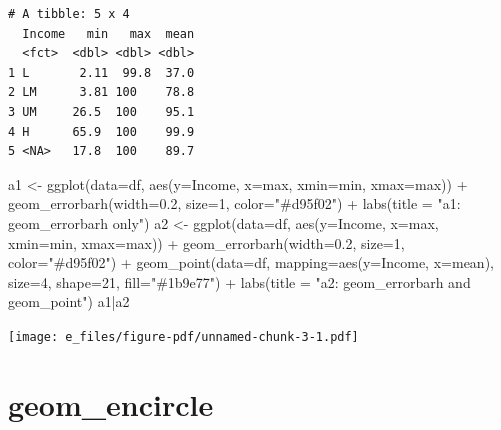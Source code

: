 \documentclass[
  letterpaper,
  DIV=11,
  numbers=noendperiod]{scrreprt}
\newenvironment{Shaded}{\begin{snugshade}}{\end{snugshade}}
\newcommand{\AttributeTok}[1]{\textcolor[rgb]{0.40,0.45,0.13}{#1}}
\newcommand{\DecValTok}[1]{\textcolor[rgb]{0.68,0.00,0.00}{#1}}
\newcommand{\FloatTok}[1]{\textcolor[rgb]{0.68,0.00,0.00}{#1}}
\newcommand{\FunctionTok}[1]{\textcolor[rgb]{0.28,0.35,0.67}{#1}}
\newcommand{\NormalTok}[1]{\textcolor[rgb]{0.00,0.23,0.31}{#1}}
\newcommand{\OtherTok}[1]{\textcolor[rgb]{0.00,0.23,0.31}{#1}}
\newcommand{\SpecialCharTok}[1]{\textcolor[rgb]{0.37,0.37,0.37}{#1}}
\newcommand{\StringTok}[1]{\textcolor[rgb]{0.13,0.47,0.30}{#1}}
\begin{document}
\begin{verbatim}
# A tibble: 5 x 4
  Income   min   max  mean
  <fct>  <dbl> <dbl> <dbl>
1 L       2.11  99.8  37.0
2 LM      3.81 100    78.8
3 UM     26.5  100    95.1
4 H      65.9  100    99.9
5 <NA>   17.8  100    89.7
\end{verbatim}

\begin{Shaded}
\begin{Highlighting}[]
\NormalTok{a1 }\OtherTok{\textless{}{-}} \FunctionTok{ggplot}\NormalTok{(}\AttributeTok{data=}\NormalTok{df, }\FunctionTok{aes}\NormalTok{(}\AttributeTok{y=}\NormalTok{Income, }\AttributeTok{x=}\NormalTok{max, }\AttributeTok{xmin=}\NormalTok{min, }\AttributeTok{xmax=}\NormalTok{max)) }\SpecialCharTok{+} 
\FunctionTok{geom\_errorbarh}\NormalTok{(}\AttributeTok{width=}\FloatTok{0.2}\NormalTok{, }\AttributeTok{size=}\DecValTok{1}\NormalTok{, }\AttributeTok{color=}\StringTok{"\#d95f02"}\NormalTok{) }\SpecialCharTok{+} 
  \FunctionTok{labs}\NormalTok{(}\AttributeTok{title =} \StringTok{"a1: geom\_errorbarh only"}\NormalTok{)}
\NormalTok{a2 }\OtherTok{\textless{}{-}} \FunctionTok{ggplot}\NormalTok{(}\AttributeTok{data=}\NormalTok{df, }\FunctionTok{aes}\NormalTok{(}\AttributeTok{y=}\NormalTok{Income, }\AttributeTok{x=}\NormalTok{max, }\AttributeTok{xmin=}\NormalTok{min, }\AttributeTok{xmax=}\NormalTok{max)) }\SpecialCharTok{+} 
  \FunctionTok{geom\_errorbarh}\NormalTok{(}\AttributeTok{width=}\FloatTok{0.2}\NormalTok{, }\AttributeTok{size=}\DecValTok{1}\NormalTok{, }\AttributeTok{color=}\StringTok{"\#d95f02"}\NormalTok{) }\SpecialCharTok{+} 
  \FunctionTok{geom\_point}\NormalTok{(}\AttributeTok{data=}\NormalTok{df, }\AttributeTok{mapping=}\FunctionTok{aes}\NormalTok{(}\AttributeTok{y=}\NormalTok{Income, }\AttributeTok{x=}\NormalTok{mean), }\AttributeTok{size=}\DecValTok{4}\NormalTok{, }\AttributeTok{shape=}\DecValTok{21}\NormalTok{, }\AttributeTok{fill=}\StringTok{"\#1b9e77"}\NormalTok{) }\SpecialCharTok{+}
  \FunctionTok{labs}\NormalTok{(}\AttributeTok{title =} \StringTok{"a2: geom\_errorbarh and geom\_point"}\NormalTok{)}
\NormalTok{a1}\SpecialCharTok{|}\NormalTok{a2}
\end{Highlighting}
\end{Shaded}

\texttt{[image: e\_files/figure-pdf/unnamed-chunk-3-1.pdf]}

\section{geom\_encircle}\label{encircle}
\end{document}
